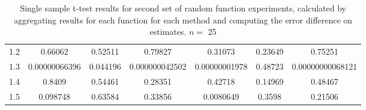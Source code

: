 \documentclass[a4paper,11pt]{article}
\begin{document}
\begin{appendices}
\begin{table}[htb]
\begin{center}
{\begin{tabular}{r|cccccc}
  1.2  &              0.66062  &   0.52511  &               0.79827  &              0.31073  &   0.23649  &                 0.75251  \\
  1.3  &  \num{0.00000066396}  &  0.044196  &  \num{0.000000042502}  &  \num{0.00000001978}  &   0.48723  &  \num{0.00000000068121}  \\
  1.4  &               0.8409  &   0.54461  &               0.28351  &              0.42718  &   0.14969  &                 0.48467  \\
  1.5  &             0.098748  &   0.63584  &               0.33856  &            0.0080649  &    0.3598  &                 0.21506  \\
  \end{tabular}
  }
  \end{center}
  \caption{Single sample t-test results for second set of random function
  experiments, calculated by aggregating results for each function for each
  method and computing the error difference on estimates. $n=$ 25} \end{table}

\end{appendices}
\end{document}

